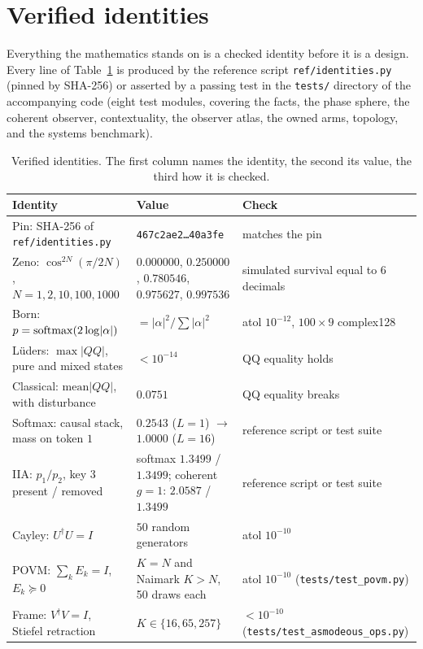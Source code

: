 \section{Verified identities}\label{sec:identities}

Everything the mathematics stands on is a checked identity before it is a design. Every line of Table~\ref{tab:identities} is produced by the reference script \texttt{ref/identities.py} (pinned by SHA-256) or asserted by a passing test in the \texttt{tests/} directory of the accompanying code (eight test modules, covering the facts, the phase sphere, the coherent observer, contextuality, the observer atlas, the owned arms, topology, and the systems benchmark).

\begin{table}[t]
\centering
\footnotesize
\caption{Verified identities. The first column names the identity, the second its value, the third how it is checked.}
\label{tab:identities}
\begin{tabular}{@{}p{3.9cm}p{5.4cm}p{6.1cm}@{}}
\toprule
Identity & Value & Check \\
\midrule
Pin: SHA-256 of \texttt{ref/identities.py} & \texttt{467c2ae2\dots40a3fe} & matches the pin \\
Zeno: $\cos^{2N}(\pi/2N)$, $N=1,2,10,100,1000$ & $0.000000$, $0.250000$, $0.780546$, $0.975627$, $0.997536$ & simulated survival equal to 6 decimals \\
Born: $p=\operatorname{softmax}(2\log\lvert\alpha\rvert)$ & $=\lvert\alpha\rvert^2/\sum\lvert\alpha\rvert^2$ & atol $10^{-12}$, $100\times 9$ complex128 \\
L\"uders: $\max\lvert QQ\rvert$, pure and mixed states & $<10^{-14}$ & QQ equality holds \\
Classical: $\mathrm{mean}\lvert QQ\rvert$, with disturbance & $0.0751$ & QQ equality breaks \\
Softmax: causal stack, mass on token $1$ & $0.2543$ ($L=1$) $\to$ $1.0000$ ($L=16$) & reference script or test suite \\
IIA: $p_1/p_2$, key $3$ present / removed & softmax $1.3499$ / $1.3499$; coherent $g=1$: $2.0587$ / $1.3499$ & reference script or test suite \\
Cayley: $U^\dagger U=I$ & $50$ random generators & atol $10^{-10}$ \\
POVM: $\sum_k E_k=I$, $E_k\succeq 0$ & $K=N$ and Naimark $K>N$, 50 draws each & atol $10^{-10}$ (\texttt{tests/test\_povm.py}) \\
Frame: $V^\dagger V=I$, Stiefel retraction & $K\in\{16,65,257\}$ & $<10^{-10}$ (\texttt{tests/test\_asmodeous\_ops.py}) \\

\end{tabular}
\end{table}
